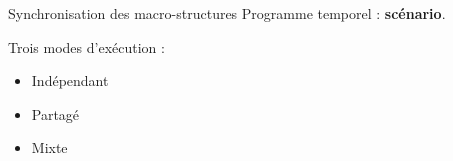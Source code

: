 \begin{block}{Synchronisation des macro-structures}
	Programme temporel : \textbf{scénario}. 
	
	Trois modes d'exécution : 
	\begin{itemize}
		\item Indépendant
		\item Partagé
		\item Mixte
	\end{itemize}
\end{block}